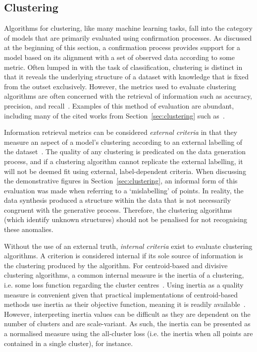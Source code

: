\subsection{Clustering}\label{subsec:clustering_evaluation}

Algorithms for clustering, like many machine learning tasks, fall into the
category of models that are primarily evaluated using confirmation processes. As
discussed at the beginning of this section, a confirmation process provides
support for a model based on its
alignment with a set of observed data according to some metric. Often lumped in
with the task of classification, clustering is distinct in that it reveals the
underlying structure of a dataset with knowledge that is fixed from the outset
exclusively. However, the metrics used to evaluate clustering algorithms are
often concerned with the retrieval of information such as accuracy, precision,
and recall~\cite{Manning2008}. Examples of this method of evaluation are
abundant, including many of the cited works from Section~\ref{sec:clustering}
such as~\cite{Agrawal1998,Aljarah2019,Bakr2015,Cao2009,Huang1998}.

Information retrieval metrics can be considered \emph{external criteria} in that
they measure an aspect of a model's clustering according to an external labelling
of the dataset~\cite{Mitchell1997}. The quality of any
clustering is predicated on the data generation process, and if a clustering
algorithm cannot replicate the external labelling, it will not be deemed fit
using external, label-dependent criteria. When discussing the demonstrative
figures in Section~\ref{sec:clustering}, an informal form of this evaluation
was made when referring to a `mislabelling' of points. In reality, the data
synthesis produced a structure within the data that is not necessarily congruent
with the generative process. Therefore, the clustering algorithms (which
identify unknown structures) should not be penalised for not recognising these
anomalies.

Without the use of an external truth, \emph{internal criteria} exist to evaluate
clustering algorithms. A criterion is considered internal if its sole source of
information is the clustering produced by the algorithm. For centroid-based and
divisive clustering algorithms, a common internal measure is the inertia of a
clustering, i.e. some loss function regarding the cluster
centres~\cite{Everitt2011}. Using inertia as a quality measure is convenient
given that practical implementations of centroid-based methods use inertia as
their objective function, meaning it is readily available~\cite{scikit-learn}.
However, interpreting inertia values can be difficult as they are dependent on
the number of clusters and are scale-variant. As such, the inertia can be
presented as a normalised measure using the all-cluster loss (i.e. the inertia
when all points are contained in a single cluster), for instance.

